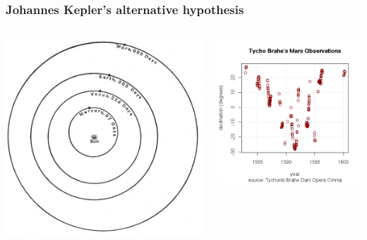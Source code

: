   \begin{frame}
    \frametitle{Johannes Kepler's alternative hypothesis}
    \begin{columns}
      \centering
      \begin{column}{0.5\textwidth}
        \includegraphics[width=\fwidth]{../figures/orbits}
      \end{column}
      \begin{column}{0.5\textwidth}
        \includegraphics[width=\fwidth]{../figures/tycho-observations}

\end{column}
\end{columns}
\end{frame}
